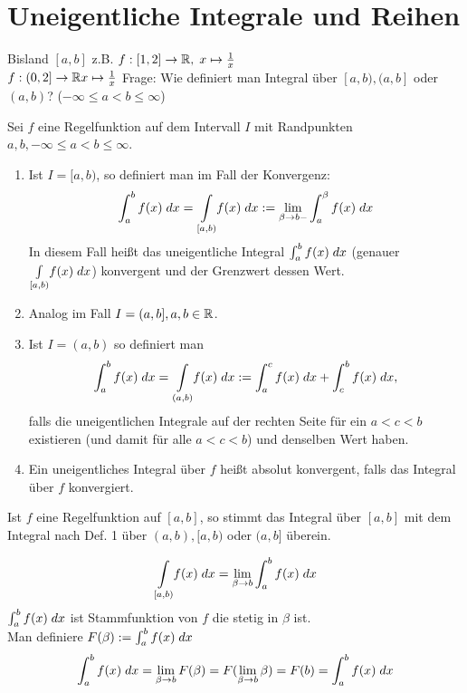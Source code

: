 \documentclass[../ana2.tex]{subfiles}
\begin{document}
\setcounter{section}{7}
\section{Uneigentliche Integrale und Reihen}
Bisland \( [a,b]  \) z.B. \( \abb{f}{[1,2]}{\R}, \;
x \mapsto \frac{1}{x} \) \\
\( \abb{f}{(0,2]}{\R} x \mapsto \frac{1}{x} \)
Frage: Wie definiert man Integral über \( [a,b), (a,b] \)
oder \( (a,b) \)? (\( -\infty \leq a < b \leq \infty \))
\begin{defi}
    Sei \(f\) eine Regelfunktion auf dem Intervall \(I\) 
    mit Randpunkten \\
    \( a, b, -\infty \leq a < b \leq \infty \).
    \begin{enumerate}
        \item Ist \( I=[a,b) \), so definiert man im 
        Fall der Konvergenz:
        \[ \integral{f(x)}{a}{b} 
        = \underset{[a,b)}{\int} f(x) \dx
        := \limesx{\beta}{b-} \integral{f(x)}{a}{\beta} \]
        In diesem Fall heißt das uneigentliche Integral 
        \( \integral{f(x)}{a}{b} \) (genauer 
        \( \underset{[a,b)}{\int} f(x) \dx \)) konvergent 
        und der Grenzwert dessen Wert.    
        \item Analog im Fall \( I = (a, b], a,b \in \R \).
        \item Ist \( I =(a,b) \) so definiert man
        \[ \integral{f(x)}{a}{b} 
        = \underset{(a,b)}{\int} f(x) \dx 
        := \integral{f(x)}{a}{c} 
        + \integral{f(x)}{c}{b}, \]
        falls die uneigentlichen Integrale auf der rechten
        Seite für ein \(a < c < b\) existieren (und damit
        für alle \( a < c < b \)) und denselben Wert haben.
        \item Ein uneigentliches Integral über \(f\) 
        heißt absolut konvergent, falls das Integral 
        über \(f\) konvergiert.
    \end{enumerate}
\end{defi}
\begin{bem}
    Ist \( f \) eine Regelfunktion auf \( [a,b] \), 
    so stimmt das  Integral über 
    \( [a,b] \) mit dem  Integral nach 
    Def. 1 über \( (a,b), [a,b) \) oder \( (a,b] \) 
    überein.
\end{bem}
\begin{bew}
    \[ \underset{[a,b)}{\int} f(x) \dx = \limesx{\beta}{b} 
    \integral{f(x)}{a}{b} \]
    \( \integral{f(x)}{a}{b} \) ist Stammfunktion von \(f\) 
    die stetig in \(\beta\) ist. \\
    Man definiere \(F(\beta) := \integral{f(x)}{a}{b}\)
    \[ \integral{f(x)}{a}{b} = \limesx{\beta}{b} F(\beta)
    = F(\limesx{\beta}{b} \beta) = F(b) 
    = \integral{f(x)}{a}{b} \]    
\end{bew}
\end{document}
